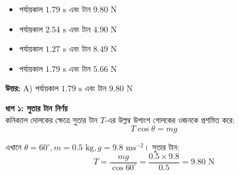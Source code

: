 \documentclass[12pt, a4paper]{article}
\begin{document}
{{\begin{center}
\end{center}
\vspace{1em}

\begin{itemize}[label={}, leftmargin=1cm, itemsep=0.5em]
    \item[\textbf{A)}] পর্যায়কাল $1.79\text{ s}$ এবং টান $9.80\text{ N}$
    \item[\textbf{B)}] পর্যায়কাল $2.54\text{ s}$ এবং টান $4.90\text{ N}$
    \item[\textbf{C)}] পর্যায়কাল $1.27\text{ s}$ এবং টান $8.49\text{ N}$
    \item[\textbf{D)}] পর্যায়কাল $1.79\text{ s}$ এবং টান $5.66\text{ N}$
\end{itemize}

\vspace{0.5em}
\begin{tcolorbox}[answerbox]
    \textbf{\color{success} উত্তর:} A) পর্যায়কাল $1.79\text{ s}$ এবং টান $9.80\text{ N}$
\end{tcolorbox}
\vspace{1em}

\begin{tcolorbox}[solutionbox={সমাধান (Solution)}]
    \noindent
    \textbf{ধাপ ১: সুতার টান নির্ণয়} \\
    কনিক্যাল দোলকের ক্ষেত্রে সুতার টান $T$-এর উল্লম্ব উপাংশ গোলকের ওজনকে প্রশমিত করে:
    \[ T \cos\theta = mg \]
    
    এখানে $\theta = 60^\circ, m = 0.5\text{ kg}, g = 9.8\text{ ms}^{-2}$। সুতার টান:
    \[ T = \frac{mg}{\cos 60^\circ} = \frac{0.5 \times 9.8}{0.5} = \mathbf{9.80}\text{ N} \]
    

\end{tcolorbox}}}
\end{document}
